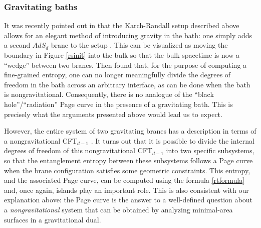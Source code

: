 \documentclass[12pt]{article}
\begin{document}
\subsubsection*{Gravitating baths }
It was recently pointed out in \cite{Geng:2020fxl} that the Karch-Randall setup described above allows for an elegant method of introducing gravity in the bath: one simply adds a second $AdS_{d}$ brane to the setup \cite{Kogan:2000vb}. This can be visualized as moving the boundary in Figure \ref{rsinit} into the bulk so that the bulk spacetime is now a ``wedge'' between two branes.   Then \cite{Geng:2020fxl} found that, for the purpose
of computing a fine-grained entropy, one can no longer meaningfully divide the degrees of freedom in the bath across an arbitrary interface,  as can be done when the bath is nongravitational.   Consequently, there is no analogue of the ``black hole''/``radiation'' Page curve in the presence of a gravitating bath. This is precisely what the arguments presented above would lead us to expect.

However, the entire system of two gravitating branes has a description in terms of a nongravitational CFT$_{d-1}$ \cite{Akal:2020wfl}. It turns out that it is possible to divide the internal degrees of freedom of this nongravitational CFT$_{d-1}$  into two specific subsystems, so that the entanglement entropy between these subsystems follows a Page curve when the brane configuration satisfies some geometric constraints. This entropy, and the associated Page curve, can be computed using the formula \eqref{rtformula} and, once again, islands play an important role. This is also consistent with our explanation above:  the Page curve is the answer to a well-defined
question about a {\em nongravitational} system that can be obtained by analyzing  minimal-area surfaces in a gravitational dual.
\end{document}
